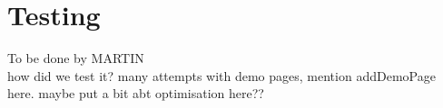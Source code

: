 \section{Testing}
To be done by MARTIN\\
how did we test it? many attempts with demo pages, mention addDemoPage here. 
maybe put a bit abt optimisation here??

